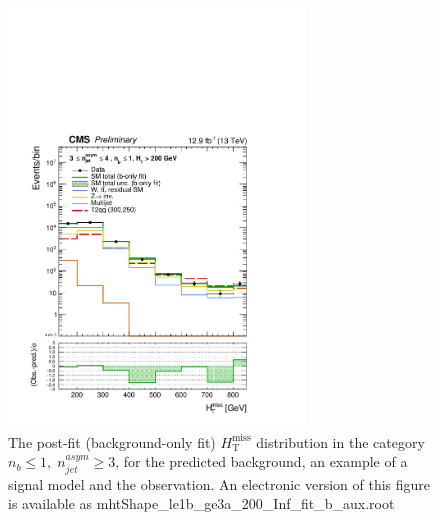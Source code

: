 \begin{figure}[tbhp]
    \caption{ 
    The post-fit (background-only fit) $H_{\mathrm{T}}^{\mathrm{miss}}$ distribution in the category $n_{b}\leq 1, \; n_{jet}^{asym} \geq 3$, 
    for the predicted background, an example of a signal model and the observation.
    An electronic version of this figure is available as mhtShape\_le1b\_ge3a\_200\_Inf\_fit\_b\_aux.root
    \label{fig:mhtShape_le1b_ge3a_fit_b} }
  \begin{center}
  \includegraphics[width=0.7\textwidth]{mhtShape_le1b_ge3a_200_Inf_fit_b_aux}
  \end{center}
\end{figure}


